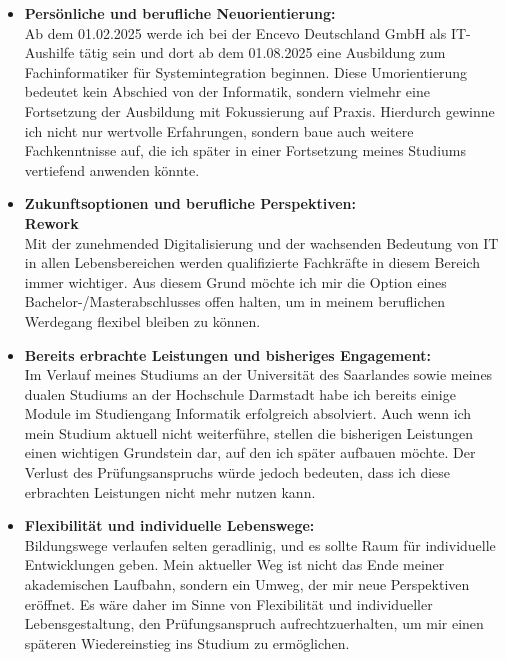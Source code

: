 \documentclass[a4paper,12pt]{article}
\begin{document}
\begin{itemize}[label={-}, labelwidth=2em, left=1em]
\item \textbf{Persönliche und berufliche Neuorientierung:}\\
Ab dem 01.02.2025 werde ich bei der Encevo Deutschland GmbH als IT-Aushilfe tätig sein und dort ab dem 01.08.2025 eine Ausbildung zum Fachinformatiker für Systemintegration beginnen.
Diese Umorientierung bedeutet kein Abschied von der Informatik, sondern vielmehr eine Fortsetzung der Ausbildung mit Fokussierung auf Praxis.
Hierdurch gewinne ich nicht nur wertvolle Erfahrungen, sondern baue auch weitere Fachkenntnisse auf, die ich später in einer Fortsetzung meines Studiums vertiefend anwenden könnte.

\break
\item \textbf{Zukunftsoptionen und berufliche Perspektiven:}\\
\textbf{Rework}\\
Mit der zunehmended Digitalisierung und der wachsenden Bedeutung von IT in allen Lebensbereichen werden qualifizierte Fachkräfte in diesem Bereich immer wichtiger.
Aus diesem Grund möchte ich mir die Option eines Bachelor-/Masterabschlusses offen halten, um in meinem beruflichen Werdegang flexibel bleiben zu können.

\item \textbf{Bereits erbrachte Leistungen und bisheriges Engagement:}\\
Im Verlauf meines Studiums an der Universität des Saarlandes sowie meines dualen Studiums an der Hochschule Darmstadt habe ich bereits einige Module im Studiengang Informatik erfolgreich absolviert.
Auch wenn ich mein Studium aktuell nicht weiterführe, stellen die bisherigen Leistungen einen wichtigen Grundstein dar, auf den ich später aufbauen möchte.
Der Verlust des Prüfungsanspruchs würde jedoch bedeuten, dass ich diese erbrachten Leistungen nicht mehr nutzen kann.

\item \textbf{Flexibilität und individuelle Lebenswege:}\\
Bildungswege verlaufen selten geradlinig, und es sollte Raum für individuelle Entwicklungen geben.
Mein aktueller Weg ist nicht das Ende meiner akademischen Laufbahn, sondern ein Umweg, der mir neue Perspektiven eröffnet.
Es wäre daher im Sinne von Flexibilität und individueller Lebensgestaltung, den Prüfungsanspruch aufrechtzuerhalten, um mir einen späteren Wiedereinstieg ins Studium zu ermöglichen.
\\
\end{itemize}
\end{document}
